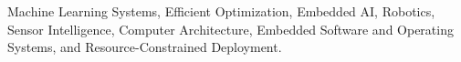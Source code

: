\noindent
Machine Learning Systems, Efficient Optimization, Embedded AI, Robotics, Sensor Intelligence, Computer Architecture, Embedded Software and Operating Systems, and Resource-Constrained Deployment.
